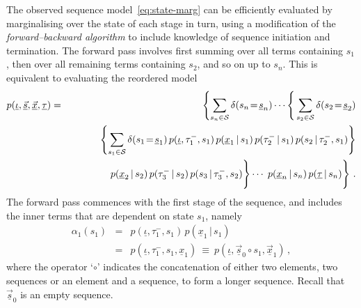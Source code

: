 \documentclass[a4paper]{article}
\newcommand{\ui}{\underline{\iota}}
\newcommand{\ut}{\underline{\tau}}
\begin{document}
The observed sequence model~\eqref{eq:state-marg} can be efficiently evaluated by marginalising over the state of each stage
in turn, using a modification of the {\em forward--backward algorithm} to include knowledge of
sequence initiation and termination.
 The forward pass involves first summing over all terms containing $s_1$, then over all remaining terms containing $s_2$,
and so on up to $s_n$. This is equivalent to evaluating the reordered model
\begin{eqnarray}
   p(\ui,\underline{\vec{s}},\underline{\vec{x}},\ut) 
& = & 
   \left\{\sum_{s_n\in{\cal S}}\delta(s_n\!=\!\underline{s}_n)
\cdots
\right\{\sum_{s_2\in{\cal S}}\delta(s_2\!=\!\underline{s}_2)
\nonumber\\&&
\hspace*{10mm}{}
\left\{\sum_{s_1\in{\cal S}}\delta(s_1\!=\!\underline{s}_1)\,
p(\ui,\tau^-_1,s_1)\,p(\underline{x}_1\,|\,s_1)\,p(\tau^-_2\,|\,s_1)\,p(s_2\,|\,\tau^-_2,s_1)\right\}
\nonumber\\&&
\left.\rule{0pt}{6mm}
p(\underline{x}_{2}\,|\,s_2)\,p(\tau^-_3\,|\,s_2)\,p(s_3\,|\,\tau^-_3,s_2)\right\}
\cdots
\left.\rule{0pt}{6mm}\,p(\underline{x}_{n}\,|\,s_n)
\,p(\ut\,|\,s_n)\right\}
\,.
\label{eq:forward}
\end{eqnarray}
 The forward pass commences with the first stage of the sequence, and includes the inner terms that are dependent on state $s_1$, namely
\begin{eqnarray}
  \alpha_1(s_1) & = & p(\ui,\tau^-_1,s_1)\,p(\underline{x}_1\,|\,s_1)
\nonumber\\&=&
p(\ui,\tau^-_1,s_1,\underline{x}_1)~\equiv~p(\ui,\underline{\vec{s}}_0\circ s_1,\underline{\vec{x}}_1)\,,
\label{eq:alpha_1}
\end{eqnarray}
where the operator `$\circ$' indicates the concatenation of either two elements, two sequences or an element and a sequence, to form a longer sequence.
Recall that $\underline{\vec{s}}_0$ is an empty sequence.
\end{document}
